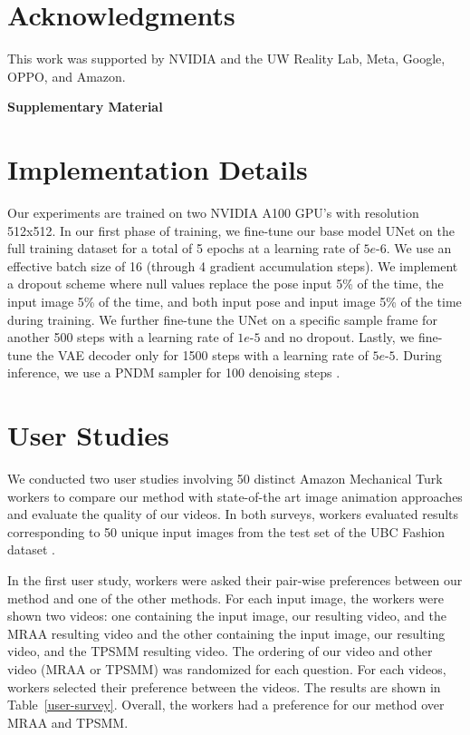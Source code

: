 \section*{Acknowledgments}
\noindent This work was supported by NVIDIA and the UW Reality Lab, Meta, Google, OPPO, and Amazon.

{\small
}

\pagebreak

\onecolumn
\setcounter{section}{0}
\begin{center}
\textbf{\Large Supplementary Material}
\end{center}
\section{Implementation Details}
    Our experiments are trained on two NVIDIA A100 GPU's with resolution 512x512. In our first phase of training, we fine-tune our base model UNet on the full training dataset for a total of 5 epochs at a learning rate of $5e{\text{-}6}$. We use an effective batch size of 16 (through 4 gradient accumulation steps). We implement a dropout scheme where null values replace the pose input 5\% of the time, the input image 5\% of the time, and both input pose and input image 5\% of the time during training.
    We further fine-tune the UNet on a specific sample frame for another 500 steps with a learning rate of $1e{\text{-}5}$ and no dropout. Lastly, we fine-tune the VAE decoder only for 1500 steps with a learning rate of $5e{\text{-}5}$. 
    During inference, we use a PNDM sampler for 100 denoising steps \cite{pndm}.
    
\section{User Studies} 
    We conducted two user studies involving 50 distinct Amazon Mechanical Turk workers to compare our method with state-of-the art image animation approaches \cite{articulated_animation} \cite{thin_plate_spline} and evaluate the quality of our videos. In both surveys, workers evaluated results corresponding to 50 unique input images from the test set of the UBC Fashion dataset \cite{ubc_fashion}.
    
    In the first user study, workers were asked their pair-wise preferences between our method and one of the other methods. For each input image, the workers were shown two videos: one containing the input image, our resulting video, and the MRAA resulting video and the other containing the input image, our resulting video, and the TPSMM resulting video. The ordering of our video and other video (MRAA or TPSMM) was randomized for each question. For each videos, workers selected their preference between the videos. The results are shown in Table~\ref{user-survey}. Overall, the workers had a preference for our method over MRAA and TPSMM.
    
